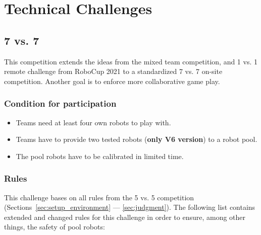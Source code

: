 \section{Technical Challenges}

\subsection{7 vs. 7}
    This competition extends the ideas from the mixed team competition, and 1 vs. 1 remote challenge from RoboCup 2021 to a standardized 7 vs. 7 on-site competition. Another goal is to enforce more collaborative game play.

    \subsubsection{Condition for participation} %
    \label{sec:7vs7:condition_for_participation}
        \begin{itemize}
            \item Teams need at least four own robots to play with. 
            \item Teams have to provide two tested robots (\textbf{only V6 version}) to a robot pool.
            \item The pool robots have to be calibrated in limited time.
        \end{itemize}

    \subsubsection{Rules}
        This challenge bases on all rules from the 5 vs. 5 competition (Sections~\ref{sec:setup_environment} — \ref{sec:judgment}). The following list contains extended and changed rules for this challenge in order to ensure, among other things, the safety of pool robots:

